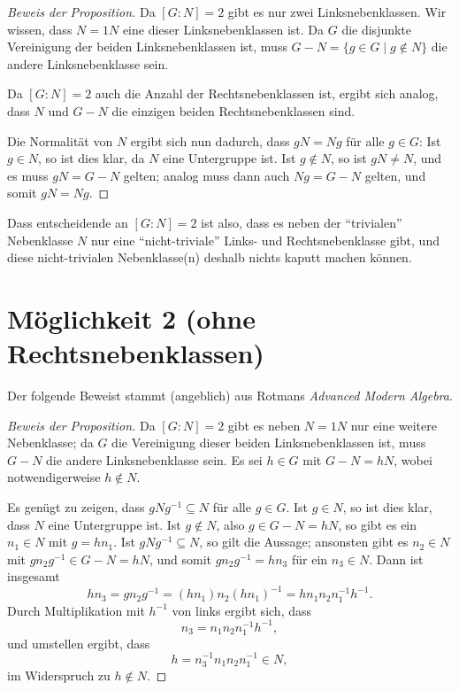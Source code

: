 \documentclass[a4paper,10pt]{article}
\begin{document}
\begin{proof}[Beweis der Proposition]
  Da $[G : N] = 2$ gibt es nur zwei Linksnebenklassen.
  Wir wissen, dass $N = 1N$ eine dieser Linksnebenklassen ist.
  Da $G$ die disjunkte Vereinigung der beiden Linksnebenklassen ist, muss $G - N = \{g \in G \mid g \notin N\}$ die andere Linksnebenklasse sein.
  
  Da $[G : N] = 2$ auch die Anzahl der Rechtsnebenklassen ist, ergibt sich analog, dass $N$ und $G - N$ die einzigen beiden Rechtsnebenklassen sind.
  
  Die Normalität von $N$ ergibt sich nun dadurch, dass $g N = N g$ für alle $g \in G$:
  Ist $g \in N$, so ist dies klar, da $N$ eine Untergruppe ist.
  Ist $g \notin N$, so ist $gN \neq N$, und es muss $gN = G - N$ gelten; analog muss dann auch $Ng = G - N$ gelten, und somit $gN = Ng$.
\end{proof}


Dass entscheidende an $[G : N] = 2$ ist also, dass es neben der ``trivialen'' Nebenklasse $N$ nur eine ``nicht-triviale'' Links- und Rechtsnebenklasse gibt, und diese nicht-trivialen Nebenklasse(n) deshalb nichts kaputt machen können.










\section{Möglichkeit 2 (ohne Rechtsnebenklassen)}


Der folgende Beweist stammt (angeblich) aus Rotmans \emph{Advanced Modern Algebra}.


\begin{proof}[Beweis der Proposition]
  Da $[G : N] = 2$ gibt es neben $N = 1N$ nur eine weitere Nebenklasse; da $G$ die Vereinigung dieser beiden Linksnebenklassen ist, muss $G - N$ die andere Linksnebenklasse sein.
  Es sei $h \in G$ mit $G - N = hN$, wobei notwendigerweise $h \notin N$.

  Es genügt zu zeigen, dass $g N g^{-1} \subseteq N$ für alle $g \in G$.
  Ist $g \in N$, so ist dies klar, dass $N$ eine Untergruppe ist.
  Ist $g \notin N$, also $g \in G - N = h N$, so gibt es ein $n_1 \in N$ mit $g = h n_1$.
  Ist $g N g^{-1} \subseteq N$, so gilt die Aussage; ansonsten gibt es $n_2 \in N$ mit $g n_2 g^{-1} \in G - N = hN$, und somit $g n_2 g^{-1} = h n_3$ für ein $n_3 \in N$.
  Dann ist insgesamt
  \[
      h n_3
    = g n_2 g^{-1}
    = (h n_1) n_2 (h n_1)^{-1}
    = h n_1 n_2 n_1^{-1} h^{-1}.
  \]
  Durch Multiplikation mit $h^{-1}$ von links ergibt sich, dass
  \[
    n_3 = n_1 n_2 n_1^{-1} h^{-1},
  \]
  und umstellen ergibt, dass
  \[
    h = n_3^{-1} n_1 n_2 n_1^{-1} \in N,
  \]
  im Widerspruch zu $h \notin N$.
\end{proof}
\end{document}
